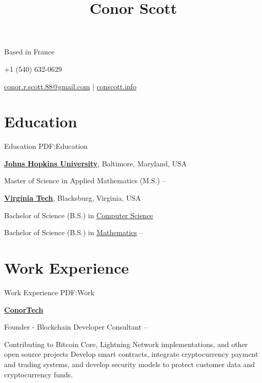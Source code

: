 \documentclass[a4paper,10pt,oneside]{article}
\begin{document}
\begin{minipage}[t][0pt]{\linewidth}


\title{Conor Scott}

\begin{subtitle}
Based in France
\par
+1 (540) 632-0629
\par
\href{mailto:conor.r.scott.88@gmail.com} {conor.r.scott.88@gmail.com} |
\href{https://conscott.info} {conscott.info}
\end{subtitle}
\begin{body}


\section
{Education}
{Education}
{PDF:Education}

\href{https://www.jhu.edu/}
{\textbf{Johns Hopkins University}},
Baltimore, Maryland, USA

\SmallEntryGap
Master of Science in Applied Mathematics (M.S.)
\hfill
{} --

\EntryGap
\href{https://www.vt.edu/}
{\textbf{Virginia Tech}},
Blacksburg, Virginia, USA
\par
Bachelor of Science (B.S.) in
\href{https://www.cs.vt.edu/}
{Computer Science}
\par
Bachelor of Science (B.S.) in
\href{https://www.math.vt.edu/}
{Mathematics}
\hfill
{} --

\section
{Work Experience}
{Work Experience}
{PDF:Work}

\EntryGap

\href{https://conscott.info}
{\textbf{ConorTech}}
\par
Founder - Blockchain Developer Consultant
\hfill
{} -- 
\begin{detail}
\BulletItem Contributing to Bitcoin Core, Lightning Network implementations, and other open source projects
\BulletItem Develop smart contracts, integrate cryptocurrency payment and trading systems, and develop security models to protect customer data and cryptocurrency funds.
\end{detail}


\end{body}
\end{minipage}
\end{document}
